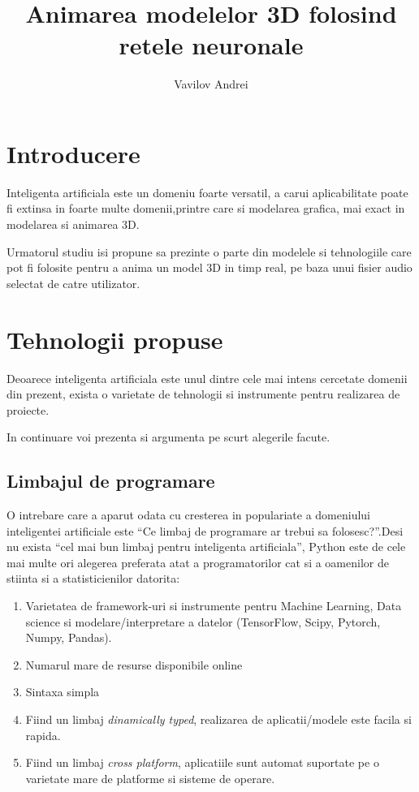\documentclass[a4paper]{article}
\author {Vavilov Andrei}
\title {Animarea modelelor 3D folosind retele neuronale}
\begin{document}
\maketitle

\section{Introducere}
    Inteligenta artificiala este un domeniu foarte versatil, a carui aplicabilitate poate fi extinsa in foarte multe
    domenii,printre care si modelarea grafica, mai exact in modelarea si animarea 3D.


    Urmatorul studiu isi propune sa prezinte o parte din modelele si tehnologiile care pot fi folosite pentru a
anima un model 3D in timp real, pe baza unui fisier audio selectat de catre utilizator.

\section{Tehnologii propuse}
Deoarece inteligenta artificiala este unul dintre cele mai intens cercetate domenii din prezent, exista o varietate de
tehnologii si instrumente pentru realizarea de proiecte.

In continuare voi prezenta si argumenta pe scurt alegerile facute.

\subsection{Limbajul de programare }
O intrebare care a aparut odata cu cresterea in populariate a domeniului inteligentei artificiale este
``Ce limbaj de programare ar trebui sa folosesc?''.Desi nu exista ``cel mai bun limbaj pentru inteligenta artificiala'', Python este de cele mai multe ori alegerea preferata atat a programatorilor cat si a oamenilor
de stiinta si a statisticienilor datorita:
\begin{enumerate}
	\item Varietatea de framework-uri si instrumente pentru Machine Learning, Data science si modelare/interpretare
		a datelor (TensorFlow, Scipy, Pytorch, Numpy, Pandas).
	\item Numarul mare de resurse disponibile online
	\item Sintaxa simpla
	\item Fiind un limbaj \textit{dinamically typed}, realizarea de aplicatii/modele este facila si rapida.
	\item Fiind un limbaj \textit{cross platform}, aplicatiile sunt automat suportate pe o varietate mare de
		platforme si sisteme de operare.
\end{enumerate}
\end{document}
